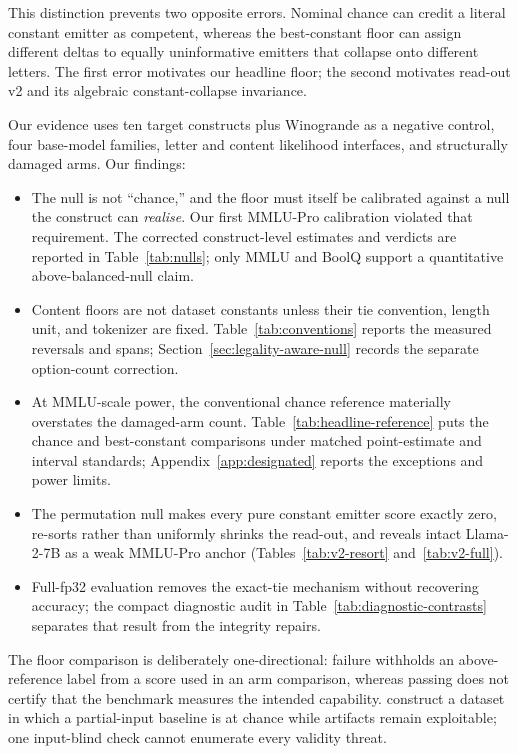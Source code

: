 This distinction prevents two opposite errors. Nominal chance can credit a literal constant emitter as competent, whereas the best-constant floor can assign different deltas to equally uninformative emitters that collapse onto different letters. The first error motivates our headline floor; the second motivates read-out v2 and its algebraic constant-collapse invariance.

Our evidence uses ten target constructs plus Winogrande as a negative control, four base-model families, letter and content likelihood interfaces, and structurally damaged arms. Our findings:

\begin{itemize}[leftmargin=*,nosep]
    \item The null is not ``chance,'' and the floor must itself be calibrated against a null the construct can \emph{realise}. Our first MMLU-Pro calibration violated that requirement. The corrected construct-level estimates and verdicts are reported in Table~\ref{tab:nulls}; only MMLU and BoolQ support a quantitative above-balanced-null claim.
    \item Content floors are not dataset constants unless their tie convention, length unit, and tokenizer are fixed. Table~\ref{tab:conventions} reports the measured reversals and spans; Section~\ref{sec:legality-aware-null} records the separate option-count correction.
    \item At MMLU-scale power, the conventional chance reference materially overstates the damaged-arm count. Table~\ref{tab:headline-reference} puts the chance and best-constant comparisons under matched point-estimate and interval standards; Appendix~\ref{app:designated} reports the exceptions and power limits.
    \item The permutation null makes every pure constant emitter score exactly zero, re-sorts rather than uniformly shrinks the read-out, and reveals intact Llama-2-7B as a weak MMLU-Pro anchor (Tables~\ref{tab:v2-resort} and~\ref{tab:v2-full}).
    \item Full-fp32 evaluation removes the exact-tie mechanism without recovering accuracy; the compact diagnostic audit in Table~\ref{tab:diagnostic-contrasts} separates that result from the integrity repairs.
\end{itemize}

The floor comparison is deliberately one-directional: failure withholds an above-reference label from a score used in an arm comparison, whereas passing does not certify that the benchmark measures the intended capability. \citet{feng2019misleading} construct a dataset in which a partial-input baseline is at chance while artifacts remain exploitable; one input-blind check cannot enumerate every validity threat.
